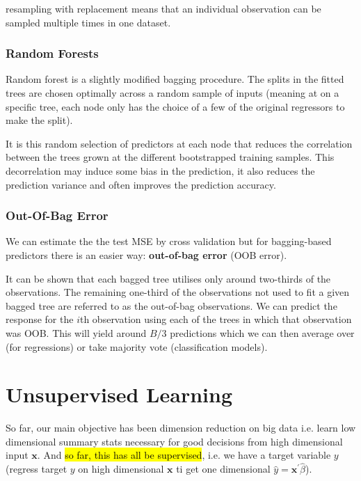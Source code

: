 \documentclass[11pt]{article}
\begin{document}
\begin{note}
    resampling with replacement means that an individual observation can be sampled multiple times in one dataset.
\end{note}
\subsubsection{Random Forests}

Random forest is a slightly modified bagging procedure. The splits in the fitted trees are chosen optimally across a random sample of inputs (meaning at on a specific tree, each node only has the choice of a few of the original regressors to make the split).

It is this random selection of predictors at each node that reduces the correlation between the trees grown at the different bootstrapped training samples. This decorrelation may induce some bias in the prediction, it also reduces the prediction variance and often improves the prediction accuracy.

\subsubsection{Out-Of-Bag Error}

We can estimate the the test MSE by cross validation but for bagging-based predictors there is an easier way: \textbf{out-of-bag error} (OOB error).

It can be shown that each bagged tree utilises only around two-thirds of the observations. The remaining one-third of the observations not used to fit a given bagged tree are referred to as the out-of-bag observations. We can predict the response for the $i$th observation using each of the trees in which that observation was OOB. This will yield around $B/3$ predictions which we can then average over (for regressions) or take majority vote (classification models).

\section{Unsupervised Learning}

So far, our main objective has been dimension reduction on big data  i.e. learn low dimensional summary stats necessary for good decisions from high dimensional input $\mathbf{x}$. And \hl{so far, this has all be supervised}, i.e. we have a target variable $y$ (regress target $y$ on high dimensional $\mathbf{x}$ ti get one dimensional $\hat{y} = \mathbf{x}^\prime\hat{\beta}$).
\end{document}
